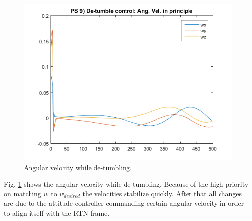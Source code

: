 \documentclass[12pt, letterpaper]{article}
\begin{document}
\begin{figure}[H]
	\centering
	\includegraphics[scale=0.8]{ps9_01}
	\caption{Angular velocity while de-tumbling.}
	\label{9:angvel}
\end{figure}

Fig. \ref{9:angvel} shows the angular velocity while de-tumbling. Because of the high priority on matching $w$ to $w_{desired}$ the velocities stabilize quickly. After that all changes are due to the attitude controller commanding certain angular velocity in order to align itself with the RTN frame.
\end{document}
